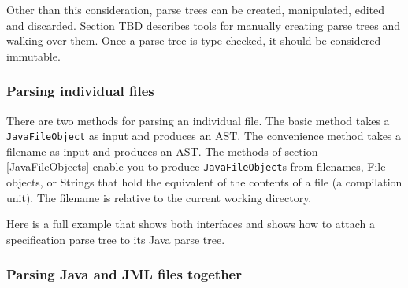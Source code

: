 Other than this consideration, parse trees can be created, manipulated, edited and discarded. Section TBD describes tools for
manually creating parse trees and walking over them. Once a parse tree is type-checked, it should be considered immutable.

\subsubsection{Parsing individual files}

There are two methods for parsing an individual file. The basic 
method takes a {\tt JavaFileObject} as input and produces an AST.
The convenience method takes a filename as input and produces an AST. The methods of section \ref{JavaFileObjects} enable you to
produce {\tt JavaFileObject}s from filenames, File objects, or Strings that hold the equivalent of the contents of a file (a compilation unit).
The filename is relative to the current working directory.

Here is a full example that shows both interfaces and shows how to attach a specification parse tree to its Java parse tree.



\subsubsection{Parsing Java and JML files together}

